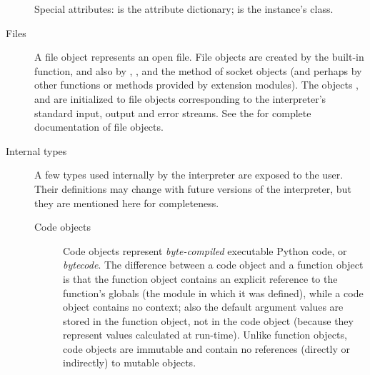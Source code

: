 \begin{description}
Special attributes:  is the attribute
dictionary;  is the instance's class.

\item[Files]
A file object represents an open file.  File objects are
created by the  built-in function,
and also by
,
, and the
method of socket objects (and perhaps by other functions or methods
provided by extension modules).  The objects
,
 and
 are initialized to file objects
corresponding to the interpreter's standard input, output
and error streams.  See the  for complete documentation of file objects.


\item[Internal types]
A few types used internally by the interpreter are exposed to the user.
Their definitions may change with future versions of the interpreter,
but they are mentioned here for completeness.

\begin{description}

\item[Code objects]
Code objects represent \emph{byte-compiled} executable Python code, or 
\emph{bytecode}.
The difference between a code
object and a function object is that the function object contains an
explicit reference to the function's globals (the module in which it
was defined), while a code object contains no context; 
also the default argument values are stored in the function object,
not in the code object (because they represent values calculated at
run-time).  Unlike function objects, code objects are immutable and
contain no references (directly or indirectly) to mutable objects.


\end{description}
\end{description}
